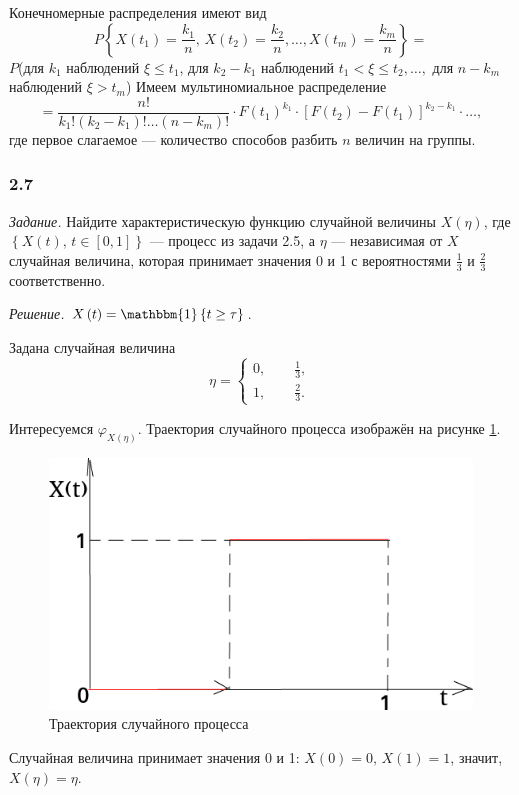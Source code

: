 Конечномерные распределения имеют вид
$$P \left\{
    X \left( t_1 \right) = \frac{k_1}{n}, \,
    X \left( t_2 \right) = \frac{k_2}{n}, \dotsc, X \left( t_m \right) = \frac{k_m}{n} \right\} =$$
$P$(для $k_1$ наблюдений $ \xi \leq t_1$, для $k_2 - k_1$ наблюдений $t_1 < \xi \leq t_2, \dotsc,$
для $n - k_m$ наблюдений $ \xi > t_m$)
Имеем мультиномиальное распределение
$$= \frac{n!}{k_1! \left( k_2 - k_1 \right)! \dotsc \left( n - k_m \right)!} \cdot
  F \left( t_1 \right)^{k_1} \cdot
  \left[ F \left( t_2 \right) - F \left( t_1 \right) \right]^{k_2 - k_1} \cdot \dotsc,$$
где первое слагаемое --- количество способов разбить $n$ величин на группы.

\subsubsection*{2.7}

\textit{Задание.}
Найдите характеристическую функцию случайной величины $X \left( \eta \right) $,
где $ \left\{ X \left( t \right), \, t \in \left[ 0, 1 \right] \right\} $ --- процесс из задачи 2.5,
а $ \eta $ --- независимая от $X$ случайная величина,
которая принимает значения 0 и 1 с вероятностями $ \frac{1}{3}$ и $ \frac{2}{3}$ соответственно.

\textit{Решение.}
$X \left( t \right) =
  \mathbbm{1} \left\{ t \geq \tau \right\} $.

Задана случайная величина
$$ \eta =
  \begin{cases}
    0, \qquad \frac{1}{3}, \\
    1, \qquad \frac{2}{3}.
  \end{cases}$$

Интересуемся $ \varphi_{X \left( \eta \right) }$.
Траектория случайного процесса изображён на рисунке \ref{fig:27}.

\begin{figure}[h!]
 \centering
 \includegraphics[width=.5\textwidth]{./pictures/2_7.png}
 \caption{Траектория случайного процесса}
 \label{fig:27}
\end{figure}

Случайная величина принимает значения 0 и 1: $X \left( 0 \right) = 0, \, X \left( 1 \right) = 1$,
значит, $X \left( \eta \right) = \eta $.

